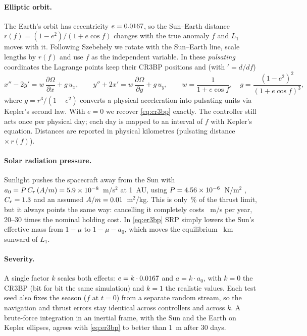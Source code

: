 \documentclass[11pt,a4paper]{article}
\begin{document}
\paragraph{Elliptic orbit.} The Earth's orbit has eccentricity $e = 0.0167$,
so the Sun--Earth distance $r(f) = (1-e^2)/(1+e\cos f)$ changes with the true
anomaly $f$ and $L_1$ moves with it. Following Szebehely \cite{szebehely1967}
we rotate with the Sun--Earth line, scale lengths by $r(f)$ and use $f$ as the
independent variable. In these \emph{pulsating} coordinates the Lagrange
points keep their CR3BP positions and (with $' = d/df$)
\begin{equation}
x'' - 2y' = w\,\frac{\partial \Omega}{\partial x} + g\,u_x, \qquad
y'' + 2x' = w\,\frac{\partial \Omega}{\partial y} + g\,u_y, \qquad
w = \frac{1}{1 + e\cos f}, \quad g = \frac{(1-e^2)^2}{(1+e\cos f)^3},
\label{eq:er3bp}
\end{equation}
where $g = r^3/(1-e^2)$ converts a physical acceleration into pulsating units
via Kepler's second law. With $e = 0$ we recover \eqref{eq:cr3bp} exactly. The
controller still acts once per physical day; each day is mapped to an interval
of $f$ with Kepler's equation. Distances are reported in physical kilometres
(pulsating distance $\times\, r(f)$).

\paragraph{Solar radiation pressure.} Sunlight pushes the spacecraft away from
the Sun with $a_0 = P\,C_r\,(A/m) = 5.9\times10^{-8}$~m/s$^2$ at 1~AU, using
$P = 4.56\times10^{-6}$~N/m$^2$ \cite{montenbruck2000}, $C_r = 1.3$ and an assumed
$A/m = 0.01$~m$^2$/kg. This is only \srpPctLimit\,\% of the thrust limit,
but it always points the same way: cancelling it completely costs
\srpDvYear~m/s per year, 20--30 times the nominal holding cost. In
\eqref{eq:er3bp} SRP simply lowers the Sun's effective mass from $1-\mu$ to
$1-\mu-a_0$, which moves the equilibrium \srpShiftKm~km sunward of $L_1$.

\paragraph{Severity.} A single factor $k$ scales both effects:
$e = k \cdot 0.0167$ and $a = k \cdot a_0$, with $k = 0$ the CR3BP (bit for bit
the same simulation) and $k = 1$ the realistic values. Each test seed also
fixes the season ($f$ at $t = 0$) from a separate random stream, so the
navigation and thrust errors stay identical across controllers and across $k$.
A brute-force integration in an inertial frame, with the Sun and the Earth on
Kepler ellipses, agrees with \eqref{eq:er3bp} to better than 1~m after 30 days.
\end{document}
